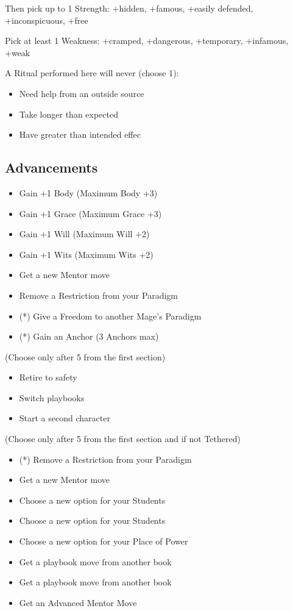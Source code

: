\documentclass[
]{memoir}
\begin{document}
Then pick up to 1 Strength: +hidden, +famous, +easily defended,
+inconspicuous, +free

Pick at least 1 Weakness: +cramped, +dangerous, +temporary, +infamous,
+weak

A Ritual performed here will never (choose 1):

\begin{itemize}
\tightlist
\item
  Need help from an outside source
\item
  Take longer than expected
\item
  Have greater than intended effec
\end{itemize}

\hypertarget{advancements-1}{%
\subsection{Advancements}\label{advancements-1}}

\begin{itemize}
\tightlist
\item
  Gain +1 Body (Maximum Body +3)
\item
  Gain +1 Grace (Maximum Grace +3)
\item
  Gain +1 Will (Maximum Will +2)
\item
  Gain +1 Wits (Maximum Wits +2)
\item
  Get a new Mentor move
\item
  Remove a Restriction from your Paradigm
\item
  (*) Give a Freedom to another Mage's Paradigm
\item
  (*) Gain an Anchor (3 Anchors max)
\end{itemize}

(Choose only after 5 from the first section)

\begin{itemize}
\tightlist
\item
  Retire to safety
\item
  Switch playbooks
\item
  Start a second character
\end{itemize}

(Choose only after 5 from the first section and if not Tethered)

\begin{itemize}
\tightlist
\item
  (*) Remove a Restriction from your Paradigm
\item
  Get a new Mentor move
\item
  Choose a new option for your Students
\item
  Choose a new option for your Students
\item
  Choose a new option for your Place of Power
\item
  Get a playbook move from another book
\item
  Get a playbook move from another book
\item
  Get an Advanced Mentor Move
\end{itemize}
\end{document}
